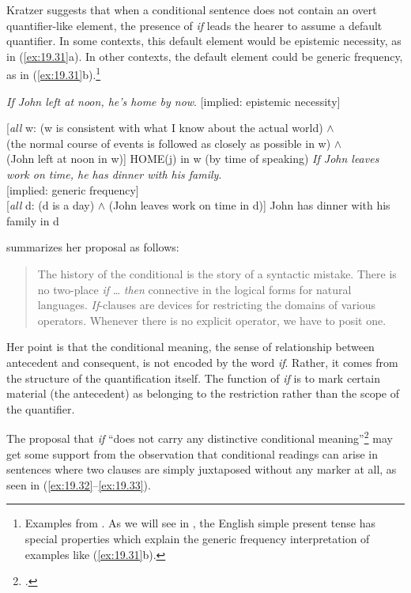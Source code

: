 Kratzer suggests that when a conditional sentence does not contain an overt quantifier-like element, the presence of \textit{if} leads the hearer to assume a default quantifier. In some contexts, this default element would be epistemic necessity, as in (\ref{ex:19.31}a). In other contexts, the default element could be generic frequency, as in (\ref{ex:19.31}b).\footnote{Examples from . As we will see in , the English simple present tense has special properties which explain the generic frequency interpretation of examples like (\ref{ex:19.31}b).}


\ea \label{ex:19.31}
\ea   \textit{If John left at noon, he’s home by now}.
\hfill  [implied: epistemic necessity]\\
  \smallskip
  
  {}[\textit{all} w: (w is consistent with what I know about the actual world) $\wedge$\\
  (the normal course of events is followed as closely as possible in w) $\wedge$\\
  (John left at noon in w)] HOME(j) in w (by time of speaking) 
\ex  \textit{If John leaves work on time, he has dinner with his family}.\\
\hfill [implied: generic frequency]\\
  
  \smallskip
  {}[\textit{all} d: (d is a day) $\wedge$ (John leaves work on time in d)] John has dinner with his family in d
\z \z


\citet[11]{Kratzer1986} summarizes her proposal as follows:


\begin{quote}
The history of the conditional is the story of a syntactic mistake. There is no two-place \textit{if} … \textit{then} connective in the logical forms for natural languages. \textit{If}-clauses are devices for restricting the domains of various operators. Whenever there is no explicit operator, we have to posit one.
\end{quote}


Her point is that the conditional meaning, the sense of relationship between antecedent and consequent, is not encoded by the word \textit{if}. Rather, it comes from the structure of the quantification itself. The function of \textit{if} is to mark certain material (the antecedent) as belonging to the restriction rather than the scope of the quantifier.



The proposal that \textit{if} “does not carry any distinctive conditional meaning”\footnote{.} may get some support from the observation that conditional readings can arise in sentences where two clauses are simply juxtaposed without any marker at all, as seen in (\ref{ex:19.32}--\ref{ex:19.33}).


